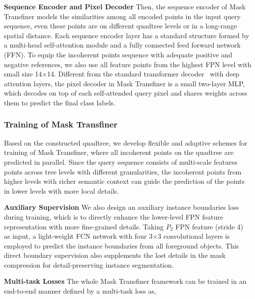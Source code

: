 \documentclass[10pt,twocolumn,letterpaper]{article}
\newcommand{\parsection}[1]{\vspace{1mm}\noindent\textbf{#1}}
\begin{document}
\parsection{Sequence Encoder and Pixel Decoder} 
Then, the sequence encoder of Mask Transfiner models the similarities among all encoded points in the input query sequence, even these points are on different quadtree levels or in a long-range spatial distance. Each sequence encoder layer has a standard structure formed by a multi-head self-attention module and a fully connected feed forward network (FFN). To equip the incoherent points sequence with adequate positive and negative references, we also use all feature points from the highest FPN level with small size 14$\times$14. Different from the standard transformer decoder~\cite{carion2020end} with deep attention layers, the pixel decoder in Mask Transfiner is a small two-layer MLP, which decodes on top of each self-attended query pixel and shares weights across them to predict the final class labels.

\subsubsection{Training of Mask Transfiner}
\label{refinement} 

Based on the constructed quadtree, we develop flexible and adaptive schemes for training of Mask Transfiner, where all incoherent points on the quadtree are predicted in parallel. Since the query sequence consists of multi-scale features points across tree levels with different granularities, the incoherent points from higher levels with richer semantic context can guide the prediction of the points in lower levels with more local details. 

\parsection{Auxiliary Supervision}
We also design an auxiliary instance boundaries loss during training, which is to directly enhance the lower-level FPN feature representation with more fine-grained details. Taking $P_2$ FPN feature (stride 4) as input, a light-weight FCN network with four 3$\times$3 convolutional layers is employed to predict the instance boundaries from all foreground objects. This direct boundary supervision also supplements the lost details in the mask compression for detail-preserving instance segmentation.

\parsection{Multi-task Losses} The whole Mask Transfiner framework can be trained in an end-to-end manner defined by a multi-task loss as,
\end{document}
